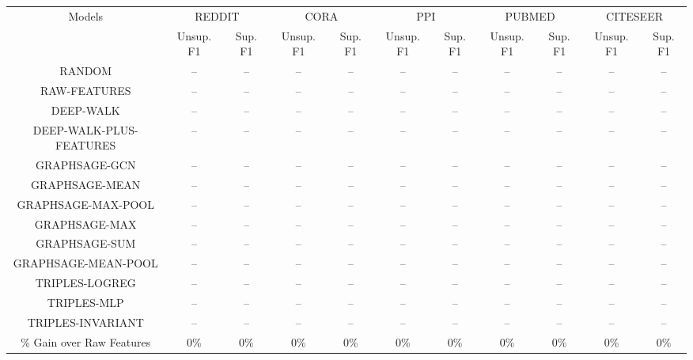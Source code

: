 \begin{tabular}{ccccccccccc}
    \hline
    \multirow{2}{*}{ Models } &
    	\multicolumn{2}{c}{ REDDIT } & 	\multicolumn{2}{c}{ CORA } & 	\multicolumn{2}{c}{ PPI } & 	\multicolumn{2}{c}{ PUBMED } & 	\multicolumn{2}{c}{ CITESEER } \\

    
    \cline { 2 - 11 } &
         Unsup. F1 & Sup. F1 &  Unsup. F1 & Sup. F1 &  Unsup. F1 & Sup. F1 &  Unsup. F1 & Sup. F1 &  Unsup. F1 & Sup. F1  \\
    
    \hline
    	RANDOM & -- & -- & -- & -- & -- & -- & -- & -- & -- & -- \\
	RAW-FEATURES & -- & -- & -- & -- & -- & -- & -- & -- & -- & -- \\
	DEEP-WALK & -- & -- & -- & -- & -- & -- & -- & -- & -- & -- \\
	DEEP-WALK-PLUS-FEATURES & -- & -- & -- & -- & -- & -- & -- & -- & -- & -- \\
	GRAPHSAGE-GCN & -- & -- & -- & -- & -- & -- & -- & -- & -- & -- \\
	GRAPHSAGE-MEAN & -- & -- & -- & -- & -- & -- & -- & -- & -- & -- \\
	GRAPHSAGE-MAX-POOL & -- & -- & -- & -- & -- & -- & -- & -- & -- & -- \\
	GRAPHSAGE-MAX & -- & -- & -- & -- & -- & -- & -- & -- & -- & -- \\
	GRAPHSAGE-SUM & -- & -- & -- & -- & -- & -- & -- & -- & -- & -- \\
	GRAPHSAGE-MEAN-POOL & -- & -- & -- & -- & -- & -- & -- & -- & -- & -- \\
	TRIPLES-LOGREG & -- & -- & -- & -- & -- & -- & -- & -- & -- & -- \\
	TRIPLES-MLP & -- & -- & -- & -- & -- & -- & -- & -- & -- & -- \\
	TRIPLES-INVARIANT & -- & -- & -- & -- & -- & -- & -- & -- & -- & -- \\

    
    \hline
    \% Gain over Raw Features & 0\% & 0\% & 0\% & 0\% & 0\% & 0\% & 0\% & 0\% & 0\% & 0\% \\
    \hline
    \end{tabular}
